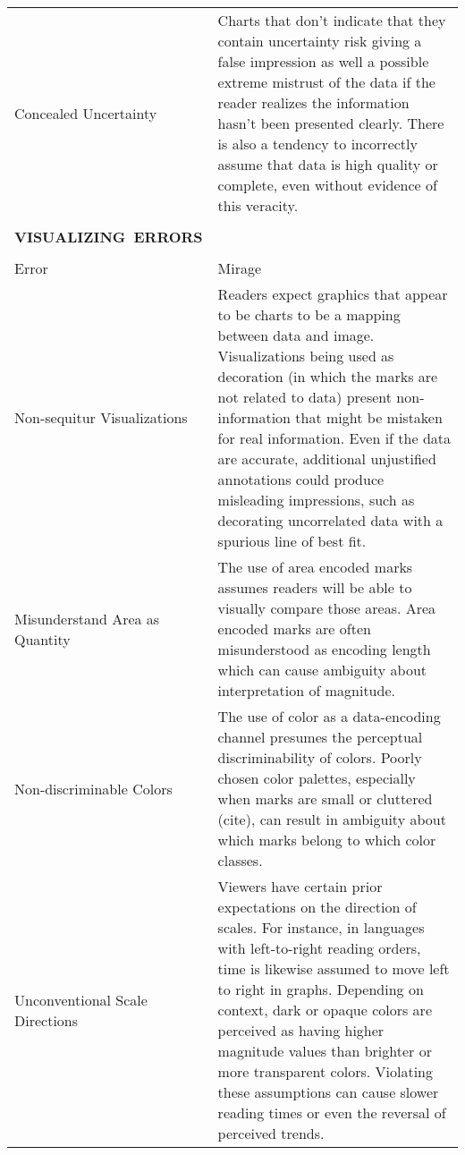 \begin{longtable}{>{\raggedright\arraybackslash}p{3cm}p{14cm}}
 \rowcolor{colorc-opaque}Concealed  Uncertainty  & Charts that don't indicate that they contain uncertainty risk giving a false impression as well a possible extreme mistrust of the data if the reader realizes the information hasn't been presented clearly. There is also a tendency to incorrectly assume that data is high quality or complete, even without evidence of this veracity. \cite{song2018s, few2019loom, mayrTrust2019, sacha2015role}\\
  

  \\\hbox{\normalsize{\textbf{VISUALIZING ERRORS}}}&\\ \\
  \normalsize{Error} & \normalsize{Mirage}\\ \hline
   \rowcolor{colorc}Non-sequitur  Visualizations  & Readers expect graphics that appear to be charts to be a mapping between data and image. Visualizations being used as decoration (in which the marks are not related to data) present non-information that might be mistaken for real information. Even if the data are accurate, additional unjustified annotations could produce misleading impressions, such as decorating uncorrelated data with a spurious line of best fit. \cite{correll2017black}\\
 \rowcolor{colorc-opaque}Misunderstand Area as Quantity  & The use of area encoded marks assumes readers will be able to visually compare those areas. Area encoded marks are often misunderstood as encoding length which can cause ambiguity about interpretation of magnitude. \cite{pandey2015deceptive, correll2017black}\\
 \rowcolor{colorc}Non-discriminable Colors  & The use of color as a data-encoding channel presumes the perceptual discriminability of colors. Poorly chosen color palettes, especially when marks are small or cluttered (cite), can result in ambiguity about which marks belong to which color classes. \cite{szafir2017modeling}\\
 \rowcolor{colorc-opaque}Unconventional Scale Directions  & Viewers have certain prior expectations on the direction of scales. For instance, in languages with left-to-right reading orders, time is likewise assumed to move left to right in graphs. Depending on context, dark or opaque colors are perceived as having higher magnitude values than brighter or more transparent colors. Violating these assumptions can cause slower reading times or even the reversal of perceived trends. \cite{correll2017black,pandey2015deceptive,tversky1991cross,schloss2018mapping}\\

\end{longtable}
